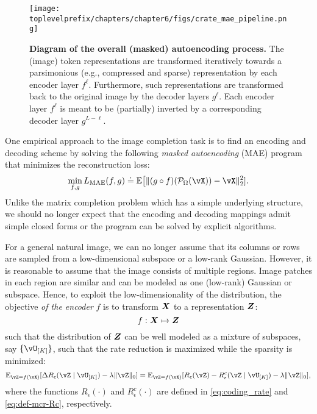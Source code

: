 \documentclass[../../book-main.tex]{subfiles}
\begin{document}
\begin{figure}[t!]
\begin{center}
  \texttt{[image: \\toplevelprefix/chapters/chapter6/figs/crate\_mae\_pipeline.png]}
\end{center}
\caption{\small \textbf{Diagram of the overall  (masked)
  autoencoding process.} The (image) token representations are
  transformed iteratively towards a parsimonious (e.g., compressed
  and sparse) representation by each encoder layer \(f^{\ell}\).
  Furthermore, such representations are transformed back to the
  original image by the decoder layers \(g^{\ell}\). Each encoder
  layer \(f^{\ell}\) is meant to be (partially) inverted by a
corresponding decoder layer \(g^{L - \ell}\).}
\label{fig:crate_mae_pipeline}
\end{figure}

One empirical approach to the image completion task is to find an encoding and decoding scheme by
solving the following {\em masked autoencoding} (MAE) program that
minimizes the reconstruction loss:
\begin{equation}\label{eq:mae_loss}
\min_{f, g} L_{\mathrm{MAE}}(f, g) \doteq \mathbb{E}\big[\norm{(g \circ
f)(\mathcal{P}_\Omega(\vX)) - \vX}_{2}^{2}].
\end{equation}
Unlike the matrix completion problem which has a simple underlying
structure, we should no longer expect that the encoding and decoding
mappings admit simple closed forms or the program can be solved by
explicit algorithms.

For a general natural image, we can no longer assume that its columns or
rows are sampled from a low-dimensional subspace or a low-rank
Gaussian. However, it is reasonable to assume that the image consists
of multiple regions. Image patches in each region are similar and can
be modeled as one (low-rank) Gaussian or subspace. Hence, to exploit
the low-dimensionality of the distribution, the objective \textit{of the
encoder} $f$ is to transform $\bm{X}$ to a representation $\bm{Z}$:
\begin{equation}
    f: \bm{X} \mapsto \bm{Z}
\end{equation}
such that the distribution of $\bm{Z}$ can be well modeled as a mixture of subspaces, say $\{\vU_{[K]}\}$,
such that the rate reduction is maximized while the sparsity is minimized:
\begin{equation}\label{eq:sparse_rr}
\mathbb{E}_{\vZ = f(\vX)}[\Delta R_{\epsilon}(\vZ \mid \vU_{[K]}) - \lambda
\norm{\vZ}_{0}] = \mathbb{E}_{\vZ = f(\vX)}[R_\epsilon(\vZ) - R^{c}_\epsilon(\vZ \mid
\vU_{[K]}) - \lambda \norm{\vZ}_{0}],
\end{equation}
where the functions $R_\epsilon(\cdot)$ and $R^c_\epsilon(\cdot)$ are defined in \eqref{eq:coding_rate} and \eqref{eq:def-mcr-Rc}, respectively. 
\end{document}
